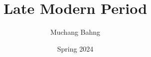 \documentclass{article}
\begin{document}
\title{Late Modern Period}
\author{Muchang Bahng}
\date{Spring 2024}

\maketitle
\tableofcontents
\pagebreak
\end{document}
